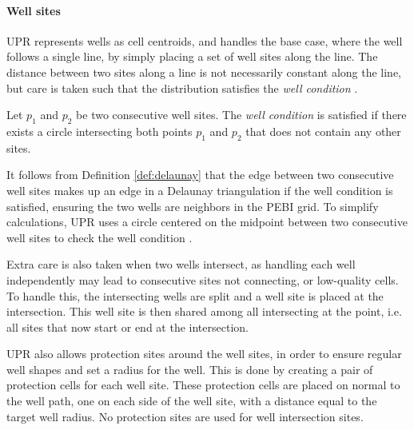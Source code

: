 \paragraph{Well sites}
\label{UPR:wells}
UPR represents wells as cell centroids, and handles the base case, where the well follows a single line, by simply placing a set of well sites along the line. The distance between two sites along a line is not necessarily constant along the line, but care is taken such that the distribution satisfies the \emph{well condition} \cite[pp.42]{UPR_thesis}.

\begin{definition}
Let $p_1$ and $p_2$ be two consecutive well sites. The \emph{well condition} is satisfied if there exists a circle intersecting both points $p_1$ and $p_2$ that does not contain any other sites.
\end{definition}

It follows from Definition \ref{def:delaunay} that the edge between two consecutive well sites makes up an edge in a Delaunay triangulation if the well condition is satisfied, ensuring the two wells are neighbors in the PEBI grid. To simplify calculations, UPR uses a circle centered on the midpoint between two consecutive well sites to check the well condition \cite{UPR_thesis}.

Extra care is also taken when two wells intersect, as handling each well independently may lead to consecutive sites not connecting, or low-quality cells. To handle this, the intersecting wells are split and a well site is placed at the intersection. This well site is then shared among all intersecting at the point, i.e. all sites that now start or end at the intersection. 

UPR also allows protection sites around the well sites, in order to ensure regular well shapes and set a radius for the well. This is done by creating a pair of protection cells for each well site. These protection cells are placed on normal to the well path, one on each side of the well site, with a distance equal to the target well radius. No protection sites are used for well intersection sites.

